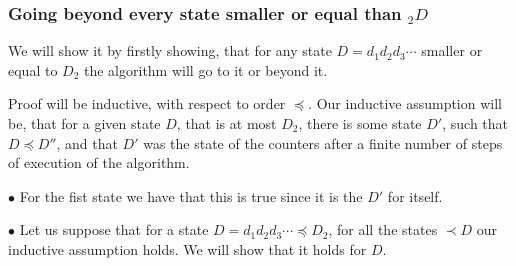 \subsubsection{Going beyond every state smaller or equal than $_2D$}\label{going beyond}
We will show it by firstly showing, that for any state $D = d_1d_2d_3\cdots$ smaller 
or equal to  
$D_2$ the algorithm will go to it or beyond it.

Proof will be inductive, with respect to order $\preceq$. Our inductive assumption will be, that 
for a given state $D$, that is at most $D_2$, 
there is some state $D'$, such 
that $D\preceq D''$, and that $D'$ was the state of the counters after a finite 
number of steps of execution of the algorithm. 

$\bullet$ For the fist state we have that this is true since it is the $D'$ for itself.

$\bullet$ Let us suppose that for a state $D = d_1d_2d_3\cdots \preceq D_2$, for  
all the states $\prec D$ our inductive assumption holds. We will show that it holds 
for $D$. 
 
